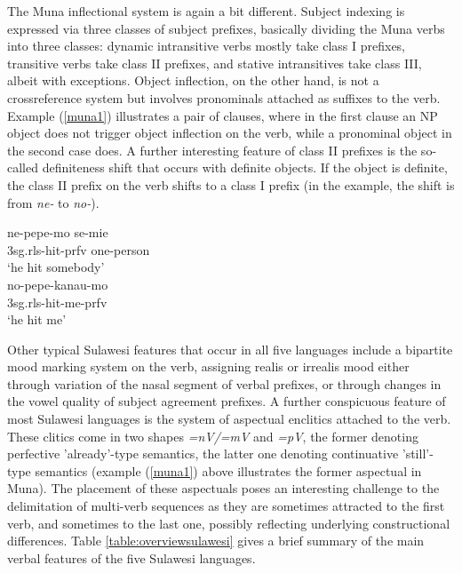 The Muna inflectional system is again a bit different. Subject indexing is expressed via three classes of subject prefixes, basically dividing the Muna verbs into three classes: dynamic intransitive verbs mostly take class I prefixes, transitive verbs take class II prefixes, and stative intransitives take class III, albeit with exceptions. Object inflection, on the other hand, is not a crossreference system but involves pronominals attached as suffixes to the verb. Example (\ref{muna1}) illustrates a pair of clauses, where in the first clause an NP object does not trigger object inflection on the verb, while a pronominal object in the second case does. A further interesting feature of class II prefixes is the so-called definiteness shift that occurs with definite objects. If the object is definite, the class II prefix on the verb shifts to a class I prefix (in the example, the shift is from \textit{ne-} to \textit{no-}).

\pex \label{muna1}
\a
\gll ne-pepe-mo se-mie \\
\acs{3}\acs{sg}.\acs{rls}-hit-\acs{prfv} one-person \\
\glft `he hit somebody' \\ 
\endgl
\a
\gll no-pepe-kanau-mo \\ 
\acs{3}\acs{sg}.\acs{rls}-hit-me-\acs{prfv} \\
\glft `he hit me' \\ 
\endgl
\xe

Other typical Sulawesi features that occur in all five languages include a bipartite mood marking system on the verb, assigning realis or irrealis mood either through variation of the nasal segment of verbal prefixes, or through changes in the vowel quality of subject agreement prefixes. A further conspicuous feature of most Sulawesi languages is the system of aspectual enclitics attached to the verb. These clitics come in two shapes \textit{=nV/=mV} and \textit{=pV}, the former denoting perfective 'already'-type semantics, the latter one denoting continuative 'still'-type semantics (example (\ref{muna1}) above illustrates the former aspectual in Muna). The placement of these aspectuals poses an interesting challenge to the delimitation of multi-verb sequences as they are sometimes attracted to the first verb, and sometimes to the last one, possibly reflecting underlying constructional differences. Table \ref{table:overviewsulawesi} gives a brief summary of the main verbal features of the five Sulawesi languages.

